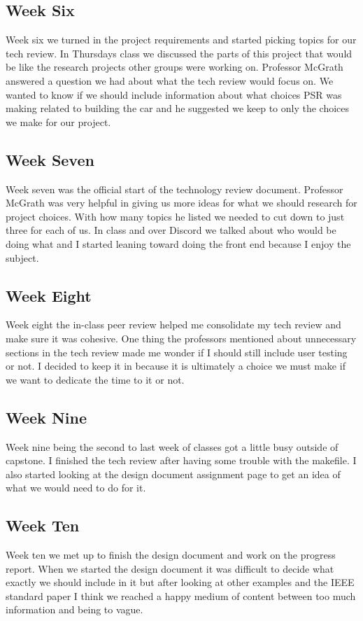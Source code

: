 \begin{singlespace}
\subsection{Week Six}
Week six we turned in the project requirements and started picking topics for our tech review. 
In Thursdays class we discussed the parts of this project that would be like the research projects other groups were working on. 
Professor McGrath answered a question we had about what the tech review would focus on.
We wanted to know if we should include information about what choices PSR was making related to building the car and he suggested we keep to only the choices we make for our project.

\subsection{Week Seven}
Week seven was the official start of the technology review document. 
Professor McGrath was very helpful in giving us more ideas for what we should research for project choices. 
With how many topics he listed we needed to cut down to just three for each of us. 
In class and over Discord we talked about who would be doing what and I started leaning toward doing the front end because I enjoy the subject.

\subsection{Week Eight}
Week eight the in-class peer review helped me consolidate my tech review and make sure it was cohesive.
One thing the professors mentioned about unnecessary sections in the tech review made me wonder if I should still include user testing or not. 
I decided to keep it in because it is ultimately a choice we must make if we want to dedicate the time to it or not.

\subsection{Week Nine}
Week nine being the second to last week of classes got a little busy outside of capstone. 
I finished the tech review after having some trouble with the makefile. 
I also started looking at the design document assignment page to get an idea of what we would need to do for it.

\subsection{Week Ten}
Week ten we met up to finish the design document and work on the progress report. 
When we started the design document it was difficult to decide what exactly we should include in it but after looking at other examples and the IEEE standard paper I think we reached a happy medium of content between too much information and being to vague.


\end{singlespace}
